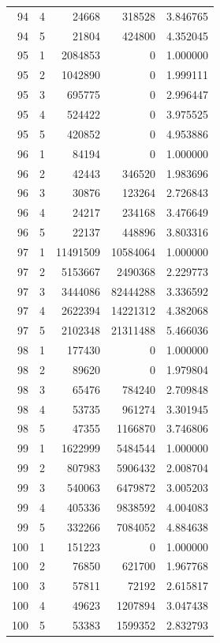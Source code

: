 \begin{longtable}{rrrrr}
94 & 4 & 24668 & 318528 & 3.846765 \\
94 & 5 & 21804 & 424800 & 4.352045 \\
95 & 1 & 2084853 & 0 & 1.000000 \\
95 & 2 & 1042890 & 0 & 1.999111 \\
95 & 3 & 695775 & 0 & 2.996447 \\
95 & 4 & 524422 & 0 & 3.975525 \\
95 & 5 & 420852 & 0 & 4.953886 \\
96 & 1 & 84194 & 0 & 1.000000 \\
96 & 2 & 42443 & 346520 & 1.983696 \\
96 & 3 & 30876 & 123264 & 2.726843 \\
96 & 4 & 24217 & 234168 & 3.476649 \\
96 & 5 & 22137 & 448896 & 3.803316 \\
97 & 1 & 11491509 & 10584064 & 1.000000 \\
97 & 2 & 5153667 & 2490368 & 2.229773 \\
97 & 3 & 3444086 & 82444288 & 3.336592 \\
97 & 4 & 2622394 & 14221312 & 4.382068 \\
97 & 5 & 2102348 & 21311488 & 5.466036 \\
98 & 1 & 177430 & 0 & 1.000000 \\
98 & 2 & 89620 & 0 & 1.979804 \\
98 & 3 & 65476 & 784240 & 2.709848 \\
98 & 4 & 53735 & 961274 & 3.301945 \\
98 & 5 & 47355 & 1166870 & 3.746806 \\
99 & 1 & 1622999 & 5484544 & 1.000000 \\
99 & 2 & 807983 & 5906432 & 2.008704 \\
99 & 3 & 540063 & 6479872 & 3.005203 \\
99 & 4 & 405336 & 9838592 & 4.004083 \\
99 & 5 & 332266 & 7084052 & 4.884638 \\
100 & 1 & 151223 & 0 & 1.000000 \\
100 & 2 & 76850 & 621700 & 1.967768 \\
100 & 3 & 57811 & 72192 & 2.615817 \\
100 & 4 & 49623 & 1207894 & 3.047438 \\
100 & 5 & 53383 & 1599352 & 2.832793 \\
\bottomrule
\end{longtable}
